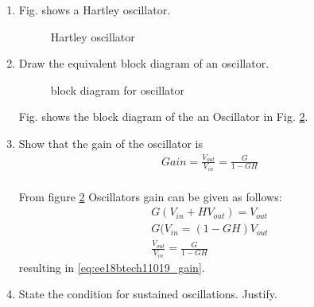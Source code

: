 \begin{enumerate}[label=\thesection.\arabic*.,ref=\thesection.\theenumi]

\item Fig. \label{fig:ee18btech11019_hart} shows a Hartley oscillator.

\begin{figure}[ht]
    \begin{center}
	    \resizebox{\columnwidth}{!}{}
	\end{center}
\caption{Hartley oscillator}
\label{fig:ee18btech11019_hart}
\end{figure}
\item Draw the equivalent block diagram of an oscillator.\\
\solution
\begin{figure}[!ht]
    \begin{center}
		
		\resizebox{\columnwidth}{!}{} %
	\end{center}
\caption{block diagram for oscillator}
\label{fig:ee18btech11019_hart_block}
\end{figure}
Fig. \label{fig:ee18btech11019_hart_block} shows the block diagram of the an Oscillator in Fig. \ref{fig:ee18btech11019_hart_block}.\\




\item Show that the gain of the oscillator is \\
\begin{align}
    Gain  = \frac{V_{out}}{V_{in}} = \frac{G}{1 - GH}
\label{eq:ee18btech11019_gain}
\end{align}
%
\\
\solution From figure \ref{fig:ee18btech11019_hart_block}
Oscillators gain can be given as follows:\\
\begin{align}
    G(V_{in} + HV_{out}) =V_{out}\\
    G(V_{in} = (1-GH)V_{out}\\
    \frac{V_{out}}{V_{in}} = \frac{G}{1 - GH}
\end{align}
%
resulting in \eqref{eq:ee18btech11019_gain}.\\



\item State the condition for sustained oscillations. Justify.


\end{enumerate}
